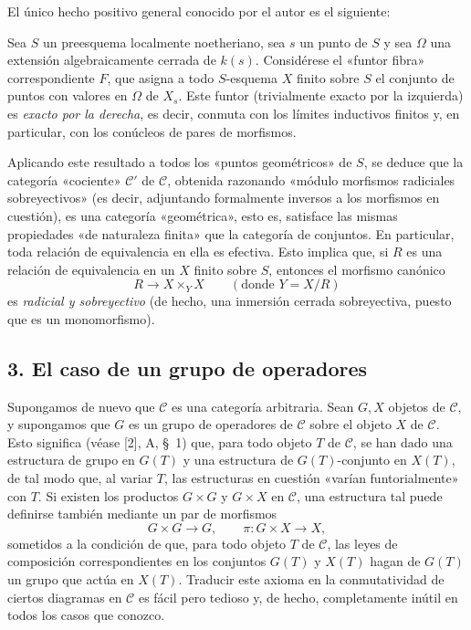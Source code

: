 El único hecho positivo general conocido por el autor es el siguiente:

 Sea $S$ un preesquema localmente noetheriano, sea
$s$ un punto de $S$ y sea $\Omega$ una extensión algebraicamente cerrada de
$k(s)$. Considérese el
«funtor fibra» correspondiente $F$, que asigna a todo $S$-esquema
$X$ finito sobre $S$ el conjunto de puntos con valores en $\Omega$ de $X_s$.
Este funtor (trivialmente exacto por la izquierda) es \emph{exacto por la
derecha}, es decir, conmuta con los límites inductivos finitos y, en
particular, con los conúcleos de pares de morfismos.

Aplicando este resultado a todos los «puntos geométricos» de $S$, se deduce
que la categoría «cociente» $\mathcal C'$ de $\mathcal C$, obtenida razonando
«módulo morfismos radiciales sobreyectivos» (es decir, adjuntando formalmente
inversos a los morfismos en cuestión), es una categoría «geométrica», esto es,
satisface las mismas propiedades «de naturaleza finita» que la categoría de
conjuntos. En particular, toda relación de equivalencia en ella es efectiva.
Esto implica que, si $R$ es una relación de equivalencia en un $X$ finito
sobre $S$, entonces el morfismo canónico
\[
  R\longrightarrow X\times_Y X\qquad (\text{donde }Y=X/R)
\]
es \emph{radicial y sobreyectivo} (de hecho, una inmersión cerrada
sobreyectiva, puesto que es un monomorfismo).

\subsection*{3. El caso de un grupo de operadores}

Supongamos de nuevo que $\mathcal C$ es una categoría arbitraria. Sean $G,X$
objetos de $\mathcal C$, y supongamos que $G$ es un grupo de operadores de
$\mathcal C$ sobre el objeto $X$ de $\mathcal C$. Esto significa (véase [2],
A, \S~1) que, para todo objeto $T$ de $\mathcal C$, se han dado una estructura
de grupo en $G(T)$ y una estructura de $G(T)$-conjunto en $X(T)$, de tal modo
que, al variar $T$, las estructuras en cuestión «varían funtorialmente» con
$T$. Si existen los productos $G\times G$ y $G\times X$ en $\mathcal C$, una
estructura tal puede definirse también mediante un par de morfismos
\[
  G\times G\longrightarrow G,
  \qquad \pi:G\times X\longrightarrow X,
\]
sometidos a la condición de que, para todo objeto $T$ de $\mathcal C$, las
leyes de composición correspondientes en los conjuntos $G(T)$ y $X(T)$ hagan
de $G(T)$ un grupo que actúa en $X(T)$. Traducir este axioma en la
conmutatividad de ciertos diagramas en $\mathcal C$ es fácil pero tedioso y,
de hecho, completamente inútil en todos los casos que conozco.

